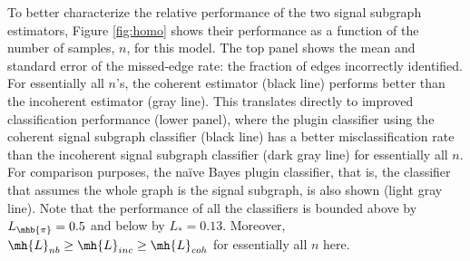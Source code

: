 \documentclass[10pt,journal,cspaper,compsoc]{IEEEtran}
\begin{document}
To better characterize the relative performance of the two signal subgraph estimators, Figure \ref{fig:homo} shows their performance as a function of the number of samples, $n$, for this model.  The top panel shows the mean and standard error of the missed-edge rate: the fraction of edges incorrectly identified.  For essentially all $n$'s, the coherent estimator (black line) performs better than the incoherent estimator (gray line).  This translates directly to improved classification performance (lower panel), where the plugin classifier using the coherent signal subgraph classifier (black line) has a better misclassification rate than the incoherent signal subgraph classifier (dark gray line) for essentially all $n$.  For comparison purposes, the na\"ive Bayes plugin classifier, that is, the classifier that assumes the whole graph is the signal subgraph, is also shown (light gray line).  Note that the performance of all the classifiers is bounded above by $L_{\mhb{\pi}} = 0.5$ and below by $L_* = 0.13$.  Moreover,  $\mh{L}_{nb} \geq \mh{L}_{inc} \geq \mh{L}_{coh}$ for essentially all $n$ here.
\end{document}
